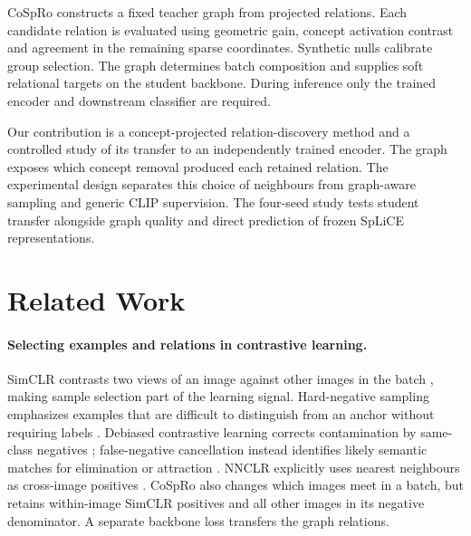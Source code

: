 \documentclass{article}
\begin{document}
CoSpRo constructs a fixed teacher graph from projected relations. Each candidate relation is evaluated using geometric gain, concept activation contrast and agreement in the remaining sparse coordinates. Synthetic nulls calibrate group selection. The graph determines batch composition and supplies soft relational targets on the student backbone. During inference only the trained encoder and downstream classifier are required.

Our contribution is a concept-projected relation-discovery method and a controlled study of its transfer to an independently trained encoder. The graph exposes which concept removal produced each retained relation. The experimental design separates this choice of neighbours from graph-aware sampling and generic CLIP supervision. The four-seed study tests student transfer alongside graph quality and direct prediction of frozen SpLiCE representations.

\section{Related Work}
\paragraph{Selecting examples and relations in contrastive learning.}
SimCLR contrasts two views of an image against other images in the batch \citep{chen2020simclr}, making sample selection part of the learning signal. Hard-negative sampling emphasizes examples that are difficult to distinguish from an anchor without requiring labels \citep{robinson2021hard}. Debiased contrastive learning corrects contamination by same-class negatives \citep{chuang2020debiased}; false-negative cancellation instead identifies likely semantic matches for elimination or attraction \citep{huynh2022false}. NNCLR explicitly uses nearest neighbours as cross-image positives \citep{dwibedi2021nnclr}. CoSpRo also changes which images meet in a batch, but retains within-image SimCLR positives and all other images in its negative denominator. A separate backbone loss transfers the graph relations.
\end{document}
